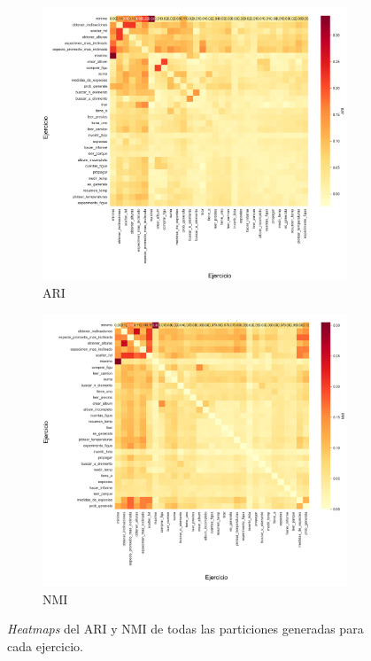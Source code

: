 \documentclass[11pt,a4paper,twoside,openany]{tesis}
\begin{document}
\begin{figure}[H]
    \centering
    \begin{subfigure}{0.45\textwidth}
        \includegraphics[width=\linewidth]{imagenes/ari.png}
        \caption{ARI}
        \label{fig:figura1}
    \end{subfigure}
    \hfill
    \begin{subfigure}{0.45\textwidth}
        \includegraphics[width=\linewidth]{imagenes/nmi.png}
        \caption{NMI}
        \label{fig:figura2}
    \end{subfigure}
    \caption{\emph{Heatmaps} del ARI y NMI de todas las particiones generadas para cada ejercicio.}
    \label{fig:figuras_juntas}
\end{figure}
\end{document}
